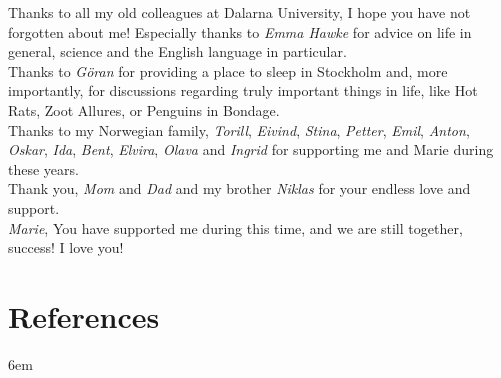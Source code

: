 \documentclass[twoside,10pt]{gihclass} %
\begin{document}
Thanks to all my old colleagues at Dalarna University, I hope you have not forgotten about me! Especially thanks to \emph{Emma Hawke} for advice on life in general, science and the English language in particular.\\

Thanks to \emph{Göran} for providing a place to sleep in Stockholm and, more importantly, for discussions regarding truly important things in life, like Hot Rats, Zoot Allures, or Penguins in Bondage.\\

Thanks to my Norwegian family, \emph{Torill}, \emph{Eivind}, \emph{Stina}, \emph{Petter}, \emph{Emil}, \emph{Anton}, \emph{Oskar}, \emph{Ida}, \emph{Bent}, \emph{Elvira}, \emph{Olava} and \emph{Ingrid} for supporting me and Marie during these years.\\

Thank you, \emph{Mom} and \emph{Dad} and my brother \emph{Niklas} for your endless love and support.\\

\emph{Marie}, You have supported me during this time, and we are still together, success! I love you!

\backmatter

\hypertarget{references}{%
\chapter*{References}\label{references}}


\setlength{\parskip}{4pt}

\rightskip6em

\footnotesize
\end{document}
